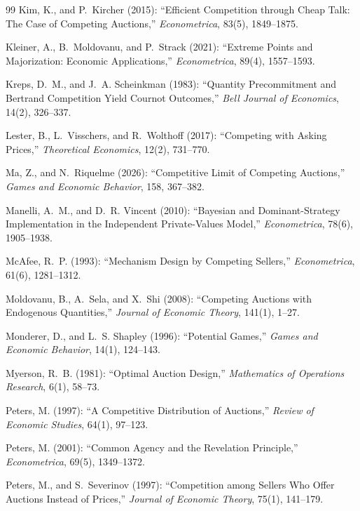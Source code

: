 \documentclass[12pt]{article}
\theoremstyle{mystyle}
\theoremstyle{mystyle2}
\newcommand{\1}{\mathbf{1}}
\begin{document}
\begin{thebibliography}{99}
 Kim, K., and P.~Kircher (2015): ``Efficient Competition through Cheap Talk: The Case of Competing Auctions,'' \emph{Econometrica}, 83(5), 1849--1875.

 Kleiner, A., B.~Moldovanu, and P.~Strack (2021): ``Extreme Points and Majorization: Economic Applications,'' \emph{Econometrica}, 89(4), 1557--1593.

 Kreps, D.~M., and J.~A. Scheinkman (1983): ``Quantity Precommitment and Bertrand Competition Yield Cournot Outcomes,'' \emph{Bell Journal of Economics}, 14(2), 326--337.

 Lester, B., L.~Visschers, and R.~Wolthoff (2017): ``Competing with Asking Prices,'' \emph{Theoretical Economics}, 12(2), 731--770.

 Ma, Z., and N.~Riquelme (2026): ``Competitive Limit of Competing Auctions,'' \emph{Games and Economic Behavior}, 158, 367--382.

 Manelli, A.~M., and D.~R. Vincent (2010): ``Bayesian and Dominant-Strategy Implementation in the Independent Private-Values Model,'' \emph{Econometrica}, 78(6), 1905--1938.

 McAfee, R.~P. (1993): ``Mechanism Design by Competing Sellers,'' \emph{Econometrica}, 61(6), 1281--1312.

 Moldovanu, B., A.~Sela, and X.~Shi (2008): ``Competing Auctions with Endogenous Quantities,'' \emph{Journal of Economic Theory}, 141(1), 1--27.

 Monderer, D., and L.~S. Shapley (1996): ``Potential Games,'' \emph{Games and Economic Behavior}, 14(1), 124--143.

 Myerson, R.~B. (1981): ``Optimal Auction Design,'' \emph{Mathematics of Operations Research}, 6(1), 58--73.

 Peters, M. (1997): ``A Competitive Distribution of Auctions,'' \emph{Review of Economic Studies}, 64(1), 97--123.

 Peters, M. (2001): ``Common Agency and the Revelation Principle,'' \emph{Econometrica}, 69(5), 1349--1372.

 Peters, M., and S.~Severinov (1997): ``Competition among Sellers Who Offer Auctions Instead of Prices,'' \emph{Journal of Economic Theory}, 75(1), 141--179.


\end{thebibliography}
\end{document}
